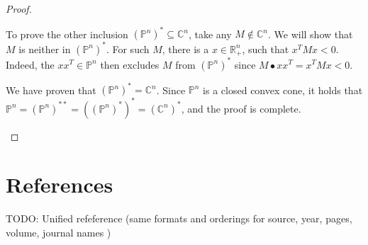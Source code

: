 \documentclass[12pt]{book}
\theoremstyle{definition}
\begin{document}
\begin{appendix}
\begin{proof}
\begin{enumerate}
To prove the other inclusion $(\mathbb{P}^n)^* \subseteq \mathbb{C}^n$, take any $M\notin \mathbb{C}^n$. We will show that $M$ is neither in $(\mathbb{P}^n)^*$. For such $M$, there is a $x\in\mathbb{R}^n_+$, such that $x^TMx<0$. Indeed, the $xx^T \in \mathbb{P}^n$ then excludes $M$ from $(\mathbb{P}^n)^*$ since $M\bullet xx^T = x^TMx<0.$

We have proven that $(\mathbb{P}^n)^* = \mathbb{C}^n$. Since $\mathbb{P}^n$ is a closed convex cone, it holds that $\mathbb{P}^n = (\mathbb{P}^n)^{**} = ((\mathbb{P}^n)^{*})^* = (\mathbb{C}^n)^*$, and the proof is complete.



\end{enumerate}
\end{proof}
\end{appendix}

\chapter*{References}

TODO: Unified refeference (same formats and orderings for source, year, pages, volume, journal names )
\end{document}
